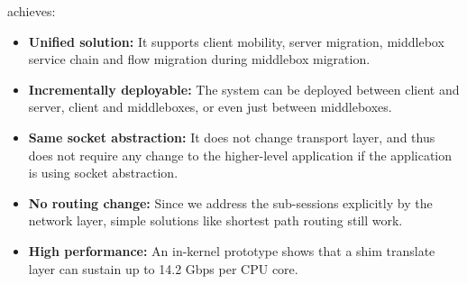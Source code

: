 

\system achieves:

\begin{itemize}
\item \textbf{Unified solution:} It  supports client mobility,  server
  migration,   middlebox  service  chain  and   flow  migration during
  middlebox migration.
\item  \textbf{Incrementally  deployable:} The system  can be deployed
  between client  and server, client   and  middleboxes, or even  just
  between middleboxes.
\item \textbf{Same socket abstraction:}  It does not change  transport
  layer,  and thus does   not require any   change to the higher-level
  application if the application is using socket abstraction.
\item  \textbf{No routing change:} Since  we  address the sub-sessions
  explicitly by the network layer, simple solutions like shortest path
  routing still work.
\item  \textbf{High performance:} An  in-kernel prototype shows that a
  shim translate layer can sustain up to 14.2 Gbps per CPU core.


\end{itemize}







